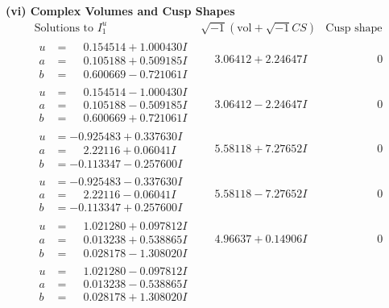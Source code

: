 \documentclass[1p]{elsarticle_modified}
\theoremstyle{definition}
\newcommand{\I}{\sqrt{-1}}
\begin{document}
\newpage\flushleft \textbf{(vi) Complex Volumes and Cusp Shapes}
$$\begin{array}{c|c|c}  
\text{Solutions to }I^u_{1}& \I (\text{vol} + \sqrt{-1}CS) & \text{Cusp shape}\\
 \hline 
\begin{aligned}
u &= \phantom{-}0.154514 + 1.000430 I \\
a &= \phantom{-}0.105188 + 0.509185 I \\
b &= \phantom{-}0.600669 - 0.721061 I\end{aligned}
 & \phantom{-}3.06412 + 2.24647 I & \phantom{-0.000000 } 0 \\ \hline\begin{aligned}
u &= \phantom{-}0.154514 - 1.000430 I \\
a &= \phantom{-}0.105188 - 0.509185 I \\
b &= \phantom{-}0.600669 + 0.721061 I\end{aligned}
 & \phantom{-}3.06412 - 2.24647 I & \phantom{-0.000000 } 0 \\ \hline\begin{aligned}
u &= -0.925483 + 0.337630 I \\
a &= \phantom{-}2.22116 + 0.06041 I \\
b &= -0.113347 - 0.257600 I\end{aligned}
 & \phantom{-}5.58118 + 7.27652 I & \phantom{-0.000000 } 0 \\ \hline\begin{aligned}
u &= -0.925483 - 0.337630 I \\
a &= \phantom{-}2.22116 - 0.06041 I \\
b &= -0.113347 + 0.257600 I\end{aligned}
 & \phantom{-}5.58118 - 7.27652 I & \phantom{-0.000000 } 0 \\ \hline\begin{aligned}
u &= \phantom{-}1.021280 + 0.097812 I \\
a &= \phantom{-}0.013238 + 0.538865 I \\
b &= \phantom{-}0.028178 - 1.308020 I\end{aligned}
 & \phantom{-}4.96637 + 0.14906 I & \phantom{-0.000000 } 0 \\ \hline\begin{aligned}
u &= \phantom{-}1.021280 - 0.097812 I \\
a &= \phantom{-}0.013238 - 0.538865 I \\
b &= \phantom{-}0.028178 + 1.308020 I\end{aligned}

\end{array}$$
\end{document}
